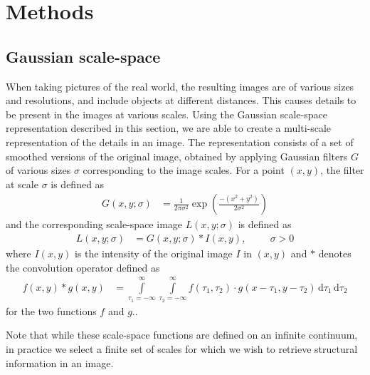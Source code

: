 \documentclass[thesis.tex]{subfiles}
\begin{document}
\chapter{Methods}

\section{Gaussian scale-space}
\label{sec:GaussianScaleSpace}
%
When taking pictures of the real world, the resulting images are of various sizes and resolutions, and include objects at different distances. This causes details to be present in the images at various scales. Using the Gaussian scale-space representation \cite{griffin1997scale,ginneken2000applications} described in this section, we are able to create a multi-scale representation of the details in an image. The representation consists of a set of smoothed versions of the original image, obtained by applying Gaussian filters $G$ of various sizes $\sigma$ corresponding to the image scales. For a point $(x,y)$, the filter at scale $\sigma$ is defined as
%
\begin{align}
	G(x,y;\sigma) &= \frac{1}{2\pi \sigma^2} \exp \left(\frac{-(x^2+y^2)}{2\sigma^2} \right)
\end{align}
%
and the corresponding scale-space image $L(x,y;\sigma)$ is defined as
%
\begin{align}
	L(x,y;\sigma) &= G(x,y;\sigma) \ast I(x,y),\hspace{1cm}\sigma > 0
\end{align}
%
where $I(x,y)$ is the intensity of the original image $I$ in $(x,y)$ and $\ast$ denotes the convolution operator defined as
\begin{align*}
	f(x,y) \ast g(x,y) &= \int\limits_{\tau_1 = -\infty}^\infty \int\limits_{\tau_2 = -\infty}^\infty f(\tau_1,\tau_2) \cdot g(x-\tau_1,y-\tau_2)\,\text{d}\tau_1\,\text{d}\tau_2
\end{align*}
for the two functions $f$ and $g$..

Note that while these scale-space functions are defined on an infinite continuum, in practice we select a finite set of scales for which we wish to retrieve structural information in an image.
\end{document}
